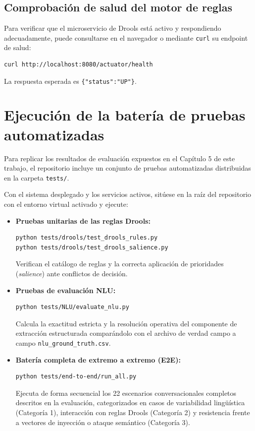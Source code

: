 \subsection{Comprobación de salud del motor de reglas}

Para verificar que el microservicio de Drools está activo y respondiendo adecuadamente, puede consultarse en el navegador o mediante \texttt{curl} su endpoint de salud:

\begin{verbatim}
curl http://localhost:8080/actuator/health
\end{verbatim}

\noindent La respuesta esperada es \texttt{\{"status":"UP"\}}.

\section{Ejecución de la batería de pruebas automatizadas}

Para replicar los resultados de evaluación expuestos en el Capítulo 5 de este trabajo, el repositorio incluye un conjunto de pruebas automatizadas distribuidas en la carpeta \texttt{tests/}.

Con el sistema desplegado y los servicios activos, sitúese en la raíz del repositorio con el entorno virtual activado y ejecute:

\begin{itemize}
    \item \textbf{Pruebas unitarias de las reglas Drools:}
\begin{verbatim}
python tests/drools/test_drools_rules.py
python tests/drools/test_drools_salience.py
\end{verbatim}
    Verifican el catálogo de reglas y la correcta aplicación de prioridades (\textit{salience}) ante conflictos de decisión.

    \item \textbf{Pruebas de evaluación NLU:}
\begin{verbatim}
python tests/NLU/evaluate_nlu.py
\end{verbatim}
    Calcula la exactitud estricta y la resolución operativa del componente de extracción estructurada comparándolo con el archivo de verdad campo a campo \texttt{nlu\_ground\_truth.csv}.

    \item \textbf{Batería completa de extremo a extremo (E2E):}
\begin{verbatim}
python tests/end-to-end/run_all.py
\end{verbatim}
    Ejecuta de forma secuencial los 22 escenarios conversacionales completos descritos en la evaluación, categorizados en casos de variabilidad lingüística (Categoría 1), interacción con reglas Drools (Categoría 2) y resistencia frente a vectores de inyección o ataque semántico (Categoría 3).
\end{itemize}

